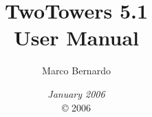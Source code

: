 \documentclass{book}
\begin{document}

\title{\huge\bf TwoTowers 5.1 \\
		User Manual}

\author{\Large Marco Bernardo}

\date{\textit{January 2006} \\[12.0cm]
      \copyright \hspace{0.01cm} 2006}

\maketitle

\tableofcontents









\end{document}
